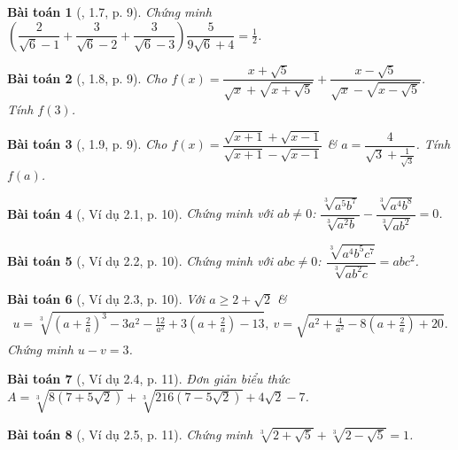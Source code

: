 \documentclass{article}
\newtheorem{baitoan}{Bài toán}
\begin{document}
\begin{baitoan}[\cite{TLCT_THCS_Toan_9_dai_so}, 1.7, p. 9]
	Chứng minh $\left(\dfrac{2}{\sqrt{6} - 1} + \dfrac{3}{\sqrt{6} - 2} + \dfrac{3}{\sqrt{6} - 3}\right)\dfrac{5}{9\sqrt{6} + 4} = \frac{1}{2}$.
\end{baitoan}

\begin{baitoan}[\cite{TLCT_THCS_Toan_9_dai_so}, 1.8, p. 9]
	Cho $f(x) = \dfrac{x + \sqrt{5}}{\sqrt{x} + \sqrt{x + \sqrt{5}}} + \dfrac{x - \sqrt{5}}{\sqrt{x} - \sqrt{x - \sqrt{5}}}$. Tính $f(3)$.
\end{baitoan}

\begin{baitoan}[\cite{TLCT_THCS_Toan_9_dai_so}, 1.9, p. 9]
	Cho $f(x) = \dfrac{\sqrt{x + 1} + \sqrt{x - 1}}{\sqrt{x + 1} - \sqrt{x - 1}}$ \& $a = \dfrac{4}{\sqrt{3} + \frac{1}{\sqrt{3}}}$. Tính $f(a)$.
\end{baitoan}

\begin{baitoan}[\cite{TLCT_THCS_Toan_9_dai_so}, Ví dụ 2.1, p. 10]
	Chứng minh với $ab\ne0$: $\dfrac{\sqrt[3]{a^5b^7}}{\sqrt[3]{a^2b}} - \dfrac{\sqrt[3]{a^4b^8}}{\sqrt[3]{ab^2}} = 0$.
\end{baitoan}

\begin{baitoan}[\cite{TLCT_THCS_Toan_9_dai_so}, Ví dụ 2.2, p. 10]
	Chứng minh với $abc\ne0$: $\dfrac{\sqrt[3]{a^4b^5c^7}}{\sqrt[3]{ab^2c}} = abc^2$.
\end{baitoan}

\begin{baitoan}[\cite{TLCT_THCS_Toan_9_dai_so}, Ví dụ 2.3, p. 10]
	Với $a\ge2 + \sqrt{2}$ \&
	\begin{align*}
		u = \sqrt[3]{\left(a + \frac{2}{a}\right)^3 - 3a^2 - \frac{12}{a^2} + 3\left(a + \frac{2}{a}\right) - 13},\ v = \sqrt{a^2 + \frac{4}{a^2} - 8\left(a + \frac{2}{a}\right) + 20}.
	\end{align*}
	Chứng minh $u - v = 3$.
\end{baitoan}

\begin{baitoan}[\cite{TLCT_THCS_Toan_9_dai_so}, Ví dụ 2.4, p. 11]
	Đơn giản biểu thức $A = \sqrt[3]{8(7 + 5\sqrt{2})} + \sqrt[3]{216(7 - 5\sqrt{2})} + 4\sqrt{2} - 7$.
\end{baitoan}

\begin{baitoan}[\cite{TLCT_THCS_Toan_9_dai_so}, Ví dụ 2.5, p. 11]
	Chứng minh $\sqrt[3]{2 + \sqrt{5}} + \sqrt[3]{2 - \sqrt{5}} = 1$.
\end{baitoan}
\end{document}
